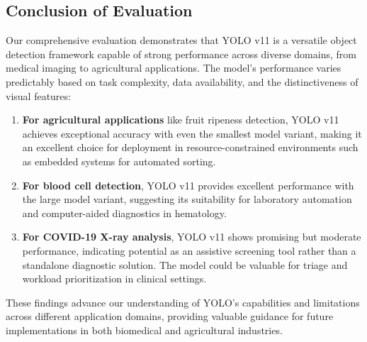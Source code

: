 \begin{multicols}{2}
\subsection{Conclusion of Evaluation}

Our comprehensive evaluation demonstrates that YOLO v11 is a versatile object detection framework capable of strong performance across diverse domains, from medical imaging to agricultural applications. The model's performance varies predictably based on task complexity, data availability, and the distinctiveness of visual features:

\begin{enumerate}
    \item \textbf{For agricultural applications} like fruit ripeness detection, YOLO v11 achieves exceptional accuracy with even the smallest model variant, making it an excellent choice for deployment in resource-constrained environments such as embedded systems for automated sorting.
    
    \item \textbf{For blood cell detection}, YOLO v11 provides excellent performance with the large model variant, suggesting its suitability for laboratory automation and computer-aided diagnostics in hematology.
    
    \item \textbf{For COVID-19 X-ray analysis}, YOLO v11 shows promising but moderate performance, indicating potential as an assistive screening tool rather than a standalone diagnostic solution. The model could be valuable for triage and workload prioritization in clinical settings.
\end{enumerate}

These findings advance our understanding of YOLO's capabilities and limitations across different application domains, providing valuable guidance for future implementations in both biomedical and agricultural industries.
\end{multicols}
